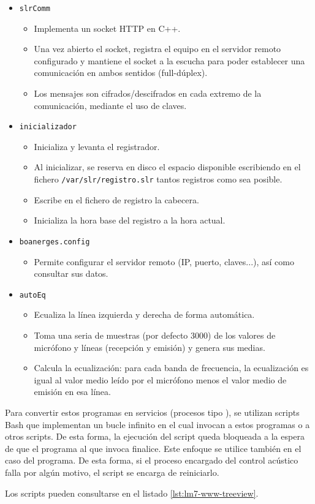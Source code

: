 \begin{itemize}
    \item \verb|slrComm|
    \begin{itemize}
        \item Implementa un socket HTTP en C++.
        \item Una vez abierto el socket, registra el equipo en el servidor remoto configurado y mantiene el socket a la escucha para poder establecer una comunicación en ambos sentidos (full-dúplex).
        \item Los mensajes son cifrados/descifrados en cada extremo de la comunicación, mediante el uso de claves.
    \end{itemize}

    \item \verb|inicializador|
    \begin{itemize}
        \item Inicializa y levanta el registrador.
        \item Al inicializar, se reserva en disco el espacio disponible escribiendo en el fichero \verb|/var/slr/registro.slr| tantos registros como sea posible.
        \item Escribe en el fichero de registro la cabecera.
        \item Inicializa la hora base del registro a la hora actual.
    \end{itemize}

    \item \verb|boanerges.config|
    \begin{itemize}
        \item Permite configurar el servidor remoto (IP, puerto, claves...), así como consultar sus datos.
    \end{itemize}

    \item \verb|autoEq|
    \begin{itemize}
        \item Ecualiza la línea izquierda y derecha de forma automática.
        \item Toma una seria de muestras (por defecto 3000) de los valores de micrófono y líneas (recepción y emisión) y genera sus medias.
        \item Calcula la ecualización: para cada banda de frecuencia, la ecualización es igual al valor medio leído por el micrófono menos el valor medio de emisión en esa línea.
    \end{itemize}

\end{itemize}

Para convertir estos programas en servicios (procesos tipo ), se utilizan scripts Bash que implementan un bucle infinito en el cual invocan a estos programas o a otros scripts. De esta forma, la ejecución del script queda bloqueada a la espera de que el programa al que invoca finalice. Este enfoque se utilice también en el caso del programa. De esta forma, si el proceso encargado del control acústico falla por algún motivo, el script se encarga de reiniciarlo.

Los scripts pueden consultarse en el listado \ref{lst:lm7-www-treeview}.
